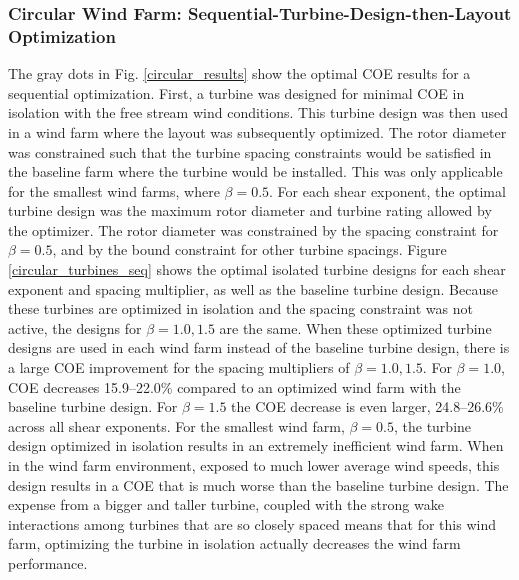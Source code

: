\documentclass[WESD, manuscript]{copernicus}
\begin{document}
\subsubsection{Circular Wind Farm: Sequential-Turbine-Design-then-Layout Optimization}
The gray dots in Fig. \ref{circular_results} show the optimal COE results for a sequential optimization. First, a turbine was designed for minimal COE in isolation with the free stream wind conditions. This turbine design was then used in a wind farm where the layout was subsequently optimized. 
The rotor diameter was constrained such that the turbine spacing constraints would be satisfied in the baseline farm where the turbine would be installed. This was only applicable for the smallest wind farms, where $\beta=0.5$. 
For each shear exponent, the optimal turbine design was the maximum rotor diameter and turbine rating allowed by the optimizer. The rotor diameter was constrained by the spacing constraint for $\beta=0.5$, and by the bound constraint for other turbine spacings.
Figure \ref{circular_turbines_seq} shows the optimal isolated turbine designs for each shear exponent and spacing multiplier, as well as the baseline turbine design. Because these turbines are optimized in isolation and the spacing constraint was not active, the designs for $\beta=1.0,1.5$ are the same. 
When these optimized turbine designs are used in each wind farm instead of the baseline turbine design, there is a large COE improvement for the spacing multipliers of $\beta=1.0, 1.5$. For $\beta=1.0$, COE decreases 15.9--22.0\% compared to an optimized wind farm with the baseline turbine design. For $\beta=1.5$ the COE decrease is even larger, 24.8--26.6\% across all shear exponents. 
For the smallest wind farm, $\beta=0.5$, the turbine design optimized in isolation results in an extremely inefficient wind farm. When in the wind farm environment, exposed to much lower average wind speeds, this design results in a COE that is much worse than the baseline turbine design. The expense from a bigger and taller turbine, coupled with the strong wake interactions among turbines that are so closely spaced means that for this wind farm, optimizing the turbine in isolation actually decreases the wind farm performance. 
\end{document}

